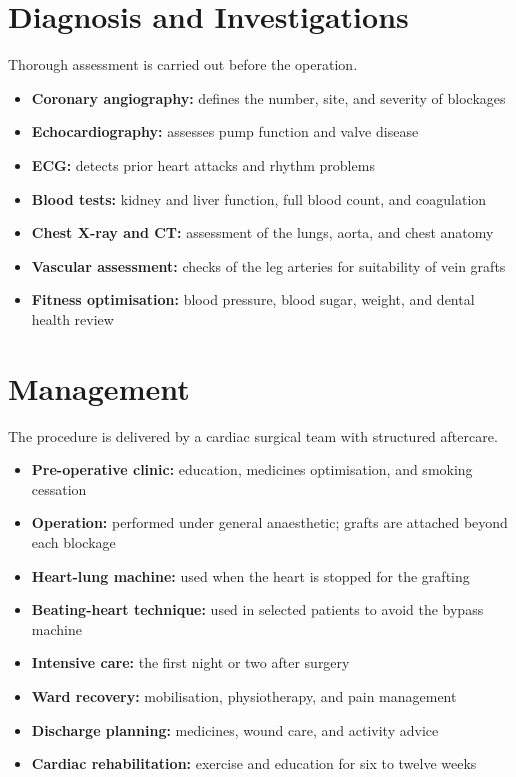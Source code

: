 \section*{Diagnosis and Investigations}
Thorough assessment is carried out before the operation.

\begin{itemize}
    \item \textbf{Coronary angiography:} defines the number, site, and severity of blockages
    \item \textbf{Echocardiography:} assesses pump function and valve disease
    \item \textbf{ECG:} detects prior heart attacks and rhythm problems
    \item \textbf{Blood tests:} kidney and liver function, full blood count, and coagulation
    \item \textbf{Chest X-ray and CT:} assessment of the lungs, aorta, and chest anatomy
    \item \textbf{Vascular assessment:} checks of the leg arteries for suitability of vein grafts
    \item \textbf{Fitness optimisation:} blood pressure, blood sugar, weight, and dental health review
\end{itemize}

\section*{Management}
The procedure is delivered by a cardiac surgical team with structured aftercare.

\begin{itemize}
    \item \textbf{Pre-operative clinic:} education, medicines optimisation, and smoking cessation
    \item \textbf{Operation:} performed under general anaesthetic; grafts are attached beyond each blockage
    \item \textbf{Heart-lung machine:} used when the heart is stopped for the grafting
    \item \textbf{Beating-heart technique:} used in selected patients to avoid the bypass machine
    \item \textbf{Intensive care:} the first night or two after surgery
    \item \textbf{Ward recovery:} mobilisation, physiotherapy, and pain management
    \item \textbf{Discharge planning:} medicines, wound care, and activity advice
    \item \textbf{Cardiac rehabilitation:} exercise and education for six to twelve weeks
\end{itemize}

